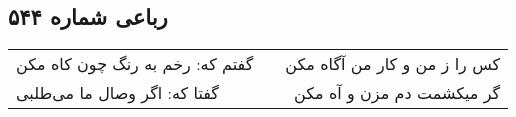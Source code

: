 \begin{center}
\section*{رباعی شماره ۵۴۴}
\label{sec:sh544}
\begin{longtable}{l p{0.5cm} r}
گفتم که: رخم به رنگ چون کاه مکن
&&
کس را ز من و کار من آگاه مکن
\\
گفتا که: اگر وصال ما می‌طلبی
&&
گر میکشمت دم مزن و آه مکن
\\
\end{longtable}
\end{center}
